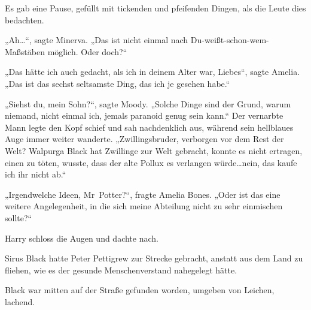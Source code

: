 Es gab eine Pause, gefüllt mit tickenden und pfeifenden Dingen, als die Leute dies bedachten.

„Ah…“, sagte Minerva. „Das ist nicht einmal nach Du-weißt-schon-wem-Maßstäben möglich. Oder doch?“

„Das hätte ich auch gedacht, als ich in deinem Alter war, Liebes“, sagte Amelia. „Das ist das sechst seltsamste Ding, das ich je gesehen habe.“

„Siehst du, mein Sohn?“, sagte Moody. „Solche Dinge sind der Grund, warum niemand, nicht einmal ich, jemals paranoid genug sein kann.“
Der vernarbte Mann legte den Kopf schief und sah nachdenklich aus, während sein hellblaues Auge immer weiter wanderte.
„Zwillingsbruder, verborgen vor dem Rest der Welt? Walpurga Black hat Zwillinge zur Welt gebracht, konnte es nicht ertragen, einen zu töten, wusste, dass der alte Pollux es verlangen würde…nein, das kaufe ich ihr nicht ab.“

„Irgendwelche Ideen, Mr~Potter?“, fragte Amelia Bones. „Oder ist das eine weitere Angelegenheit, in die sich meine Abteilung nicht zu sehr einmischen sollte?“

Harry schloss die Augen und dachte nach.

Sirus Black hatte Peter Pettigrew zur Strecke gebracht, anstatt aus dem Land zu fliehen, wie es der gesunde Menschenverstand nahegelegt hätte.

Black war mitten auf der Straße gefunden worden, umgeben von Leichen, lachend.

